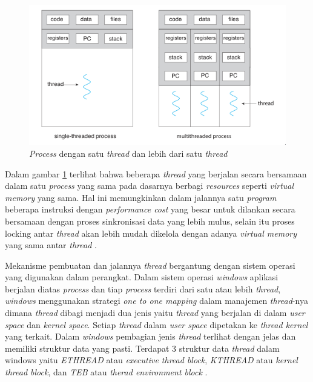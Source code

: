 \begin{figure}[H]
  \centering
	\includegraphics[keepaspectratio, width=12cm]{gambar/thread_process.png}
  \caption{\emph{Process} dengan satu \emph{thread} dan lebih dari satu \emph{thread} \citep{operatingsystemconcept}}
	\label{gambar:thread_process}
\end{figure}

Dalam gambar \ref{gambar:thread_process} terlihat bahwa beberapa \emph{thread} yang berjalan secara bersamaan dalam satu \emph{process} yang sama pada dasarnya berbagi \emph{resources} seperti \emph{virtual memory} yang sama. Hal ini memungkinkan dalam jalannya satu \emph{program} beberapa instruksi dengan \emph{performance cost} yang besar untuk dilankan secara bersamaan dengan proses sinkronisasi data yang lebih mulus, selain itu proses locking antar \emph{thread} akan lebih mudah dikelola dengan adanya \emph{virtual memory} yang sama antar \emph{thread} \citep{operatingsystemconcept}. 

Mekanisme pembuatan dan jalannya \emph{thread} bergantung dengan sistem operasi yang digunakan dalam perangkat. Dalam sistem operasi \emph{windows} aplikasi berjalan diatas \emph{process} dan tiap \emph{process} terdiri dari satu atau lebih \emph{thread}, \emph{windows} menggunakan strategi \emph{one to one mapping} dalam manajemen \emph{thread}-nya dimana \emph{thread} dibagi menjadi dua jenis yaitu \emph{thread} yang berjalan di dalam \emph{user space} dan \emph{kernel space}. Setiap \emph{thread} dalam \emph{user space} dipetakan ke \emph{thread kernel} yang terkait. Dalam \emph{windows} pembagian jenis \emph{thread} terlihat dengan jelas dan memiliki struktur data yang pasti. Terdapat 3 struktur data \emph{thread} dalam windows yaitu \emph{ETHREAD} atau \emph{executive thread block}, \emph{KTHREAD} atau \emph{kernel thread block}, dan \emph{TEB} atau \emph{therad environment block} \citep{operatingsystemconcept}.

